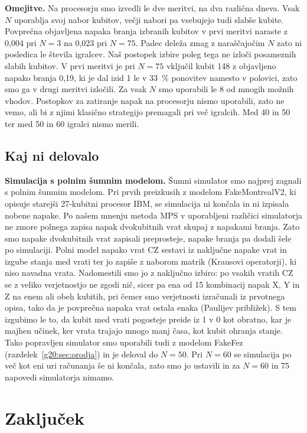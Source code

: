 \textbf{Omejitve.} Na procesorju smo izvedli le dve meritvi, na dva različna dneva. Vsak $N$ uporablja svoj nabor kubitov, večji nabori pa vsebujejo tudi slabše kubite. Povprečna objavljena napaka branja izbranih kubitov v prvi meritvi naraste z 0,004 pri $N=3$ na 0,023 pri $N=75$. Padec deleža zmag z naraščajočim $N$ zato ni posledica le števila igralcev. Naš postopek izbire poleg tega ne izloči posameznih slabih kubitov. V prvi meritvi je pri $N=75$ vključil kubit 148 z objavljeno napako branja 0,19, ki je dal izid 1 le v 33~\% ponovitev namesto v polovici, zato smo ga v drugi meritvi izločili. Za vsak $N$ smo uporabili le 8 od mnogih možnih vhodov. Postopkov za zatiranje napak na procesorju nismo uporabili, zato ne vemo, ali bi z njimi klasično strategijo premagali pri več igralcih. Med 40 in 50 ter med 50 in 60 igralci nismo merili.

\subsection{Kaj ni delovalo}
\label{g20:sec:neuspehi}

\textbf{Simulacija s polnim šumnim modelom.} Šumni simulator smo najprej zagnali s polnim šumnim modelom. Pri prvih preizkusih z modelom FakeMontrealV2, ki opisuje starejši 27-kubitni procesor IBM, se simulacija ni končala in ni izpisala nobene napake. Po našem mnenju metoda MPS v uporabljeni različici simulatorja ne zmore polnega zapisa napak dvokubitnih vrat skupaj z napakami branja. Zato smo napake dvokubitnih vrat zapisali preprosteje, napake branja pa dodali šele po simulaciji. Polni model napako vrat CZ sestavi iz naključne napake vrat in izgube stanja med vrati ter jo zapiše z naborom matrik (Krausovi operatorji), ki niso navadna vrata. Nadomestili smo jo z naključno izbiro: po vsakih vratih CZ se z veliko verjetnostjo ne zgodi nič, sicer pa ena od 15 kombinacij napak X, Y in Z na enem ali obeh kubitih, pri čemer smo verjetnosti izračunali iz prvotnega opisa, tako da je povprečna napaka vrat ostala enaka (Paulijev približek). S tem izgubimo le to, da kubit med vrati pogosteje preide iz 1 v 0 kot obratno, kar je majhen učinek, ker vrata trajajo mnogo manj časa, kot kubit ohranja stanje. Tako popravljen simulator smo uporabili tudi z modelom FakeFez (razdelek~\ref{g20:sec:orodja}) in je deloval do $N=50$. Pri $N=60$ se simulacija po več kot eni uri računanja še ni končala, zato smo jo ustavili in za $N=60$ in 75 napovedi simulatorja nimamo.


\section{Zaključek}
\label{g20:sec:zakljucek}

